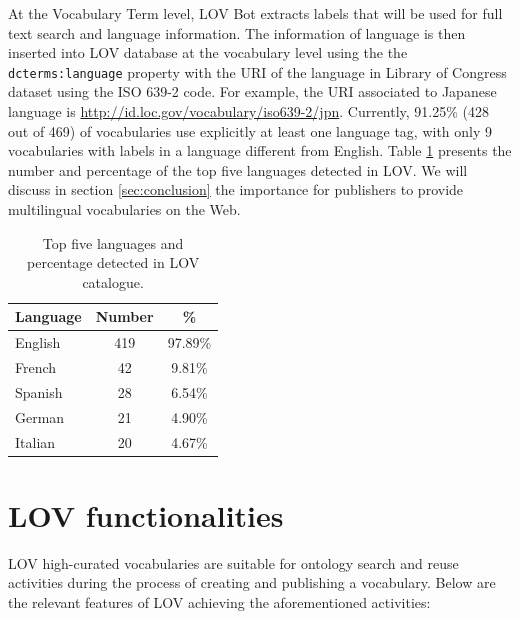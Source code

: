 \documentclass{iosart2c}
\newcommand{\py}[1]{\textcolor{olive}{\textbf{[PIERRE-YVES TO:#1]}}}
\begin{document}
At the Vocabulary Term level, LOV Bot extracts labels that will be used for full text search and language information. The information of language is then inserted into LOV database at the vocabulary level using the the \texttt{dcterms:language} property with the URI of the language in Library of Congress dataset using the ISO 639-2 code. For example, the URI associated to Japanese language is \url{http://id.loc.gov/vocabulary/iso639-2/jpn}. Currently, 91.25\% (428 out of 469) of vocabularies use explicitly at least one language tag, with only 9 vocabularies with labels in a language different from English. Table \ref{tab:language} presents the number and percentage of the top five languages detected in LOV. We will discuss in section \ref{sec:conclusion} the importance for publishers to provide multilingual vocabularies on the Web.
 
 \begin{table}[h!tb]
\caption{Top five languages and percentage detected in LOV catalogue.}
\begin{tabular}{lcc}
\hline
\textbf{Language} & \textbf{Number} & \textbf{\%}  \\ \hline
English  & 419   &  97.89\%      \\
French & 42 & 9.81\% \\
Spanish & 28 & 6.54\%\\
German & 21 & 4.90\%\\
Italian & 20 & 4.67\%\\
\hline  
\end{tabular}
\label{tab:language}
\end{table}

\section{LOV functionalities}
\label{sec:about}


LOV high-curated vocabularies are suitable for ontology search and reuse activities during the process of creating and publishing a vocabulary. Below are the relevant features of LOV achieving the aforementioned activities:
\end{document}
